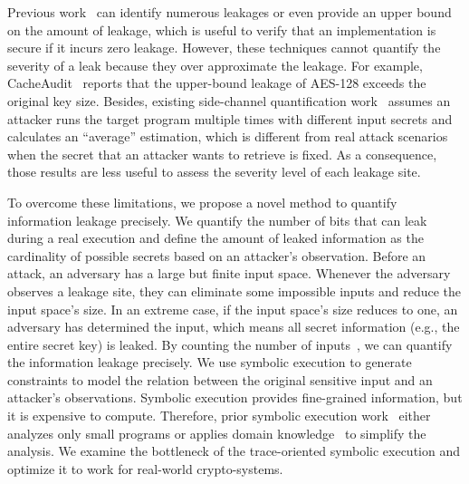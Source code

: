 Previous work~\cite{182946,5207642} can identify numerous leakages or even provide an upper bound on the amount of leakage, which is useful to verify that an implementation is secure if it incurs zero leakage.
However, these techniques cannot quantify the severity of a leak because they over approximate the leakage. For example, CacheAudit~\cite{182946} 
reports that the upper-bound leakage of AES-128 exceeds the original key size. Besides, existing side-channel quantification work~\cite{182946,5207642} assumes an attacker runs the target program multiple times with different
input secrets and calculates an ``average'' estimation, which is different from real attack scenarios when the secret that an attacker wants to retrieve is fixed. As a consequence, those results are less useful to assess the severity level of each leakage site.

To overcome these limitations, we propose a novel method to quantify information 
leakage precisely. We quantify the number of bits that can leak during a real 
execution and define the amount of leaked information as the cardinality of 
possible secrets based on an attacker's observation. Before an attack, an adversary has a large but finite input space. 
Whenever the adversary observes a leakage site, they can eliminate some impossible 
inputs and reduce the input space's size. In an extreme case, if the input space's size reduces to one, an adversary has determined the input, which means all secret information (e.g., the entire secret key) is
leaked. By counting the number of inputs~\cite{10.1007/11499107_24}, we can quantify the information leakage precisely.
We use symbolic execution to generate constraints to model the relation 
between the original sensitive input and an attacker's observations. 
Symbolic execution provides fine-grained information, but it is expensive
to compute. Therefore, prior symbolic
execution work~\cite{203878,236338,Brotzman19Casym} either analyzes only
small programs or applies domain knowledge~\cite{203878} to simplify the analysis. We
examine the bottleneck of the trace-oriented symbolic execution and optimize it
to work for real-world crypto-systems.

